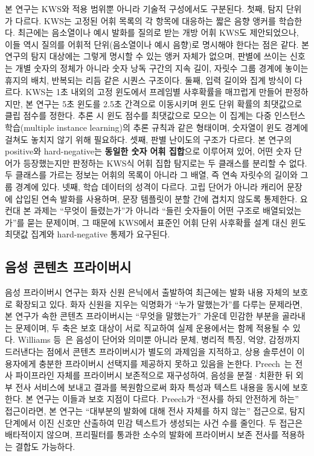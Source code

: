 \documentclass[11pt]{article}
\renewcommand{\emph}[1]{\textbf{#1}}
\begin{document}
본 연구는 KWS와 적용 범위뿐 아니라 기술적 구성에서도 구분된다. 첫째, 탐지 단위가 다르다.
KWS는 고정된 어휘 목록의 각 항목에 대응하는 짧은 음향 앵커를 학습한다. 최근에는 음소열이나
예시 발화를 질의로 받는 개방 어휘 KWS도 제안되었으나, 이들 역시 질의를 어휘적
단위(음소열이나 예시 음향)로 명시해야 한다는 점은 같다. 본 연구의 탐지 대상에는 그렇게
명시할 수 있는 앵커 자체가 없으며, 판별에 쓰이는 신호는 개별 숫자의 정체가 아니라 숫자 낭독
구간의 지속 길이, 자릿수 그룹 경계에 놓이는 휴지의 배치, 반복되는 리듬 같은 시퀀스 구조이다.
둘째, 입력 길이와 집계 방식이 다르다. KWS는 1초 내외의 고정 윈도에서 프레임별 사후확률을
매끄럽게 만들어 판정하지만, 본 연구는 5초 윈도를 2.5초 간격으로 이동시키며 윈도 단위 확률의
최댓값으로 클립 점수를 정한다. 추론 시 윈도 점수를 최댓값으로 모으는 이 집계는 다중 인스턴스
학습(multiple instance learning)의 추론 규칙과 같은 형태이며, 숫자열이 윈도 경계에 걸쳐도
놓치지 않기 위해 필요하다. 셋째, 판별 난이도의 구조가 다르다. 본 연구의 positive와
hard-negative는 \emph{동일한 숫자 어휘 집합}으로 이루어져 있어, 어떤 숫자 단어가 등장했는지만
판정하는 KWS식 어휘 집합 탐지로는 두 클래스를 분리할 수 없다. 두 클래스를 가르는 정보는
어휘의 목록이 아니라 그 배열, 즉 연속 자릿수의 길이와 그룹 경계에 있다. 넷째, 학습 데이터의
성격이 다르다. 고립 단어가 아니라 캐리어 문장에 삽입된 연속 발화를 사용하며, 문장 템플릿이
분할 간에 겹치지 않도록 통제한다. 요컨대 본 과제는 ``무엇이 들렸는가''가 아니라 ``들린
숫자들이 어떤 구조로 배열되었는가''를 묻는 문제이며, 그 때문에 KWS에서 표준인 어휘 단위
사후확률 설계 대신 윈도 최댓값 집계와 hard-negative 통제가 요구된다.

\subsection{음성 콘텐츠 프라이버시}
음성 프라이버시 연구는 화자 신원 은닉에서 출발하여 최근에는 발화 내용 자체의 보호로
확장되고 있다. 화자 신원을 지우는 익명화가 ``누가 말했는가''를 다루는 문제라면, 본 연구가
속한 콘텐츠 프라이버시는 ``무엇을 말했는가'' 가운데 민감한 부분을 골라내는 문제이며, 두 축은
보호 대상이 서로 직교하여 실제 운용에서는 함께 적용될 수 있다. Williams
등~\cite{williams2022content}은 음성이 단어와 의미뿐 아니라 문체, 병리적 특징, 억양, 감정까지
드러낸다는 점에서 콘텐츠 프라이버시가 별도의 과제임을 지적하고, 상용 솔루션이 이용자에게
충분한 프라이버시 선택지를 제공하지 못하고 있음을 논한다. Preech~\cite{ahmed2020preech}는
전사 파이프라인 자체를 프라이버시 보존적으로 재구성하여, 음성을 분절·치환한 뒤 외부
전사 서비스에 보내고 결과를 복원함으로써 화자 특성과 텍스트 내용을 동시에 보호한다.
본 연구는 이들과 보호 지점이 다르다. Preech가 ``전사를 하되 안전하게 하는'' 접근이라면,
본 연구는 ``대부분의 발화에 대해 전사 자체를 하지 않는'' 접근으로, 탐지 단계에서 이진
신호만 산출하여 민감 텍스트가 생성되는 사건 수를 줄인다. 두 접근은 배타적이지 않으며,
프리필터를 통과한 소수의 발화에 프라이버시 보존 전사를 적용하는 결합도 가능하다.
\end{document}
